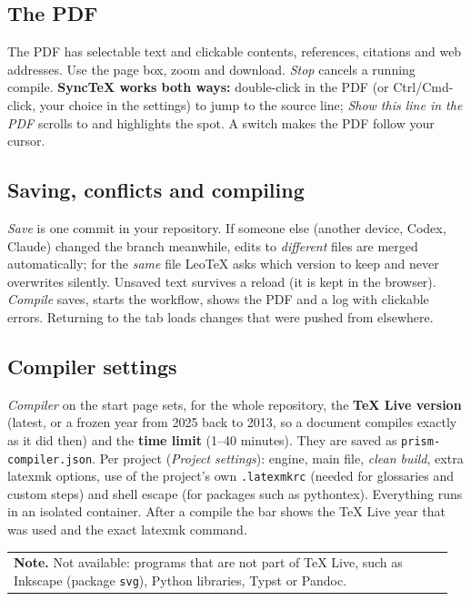 \documentclass[11pt,a4paper]{article}
\newcommand{\leotex}{Leo\TeX{}}
\newcommand{\fpath}[1]{\texttt{\small #1}}
\newenvironment{note}{\par\medskip\noindent\begin{tabular}{|p{0.955\linewidth}}\color{accent}\textbf{Note.} }{\end{tabular}\par\medskip}
\begin{document}
\subsection{The PDF}
The PDF has selectable text and clickable contents, references, citations and web addresses. Use the page box, zoom and download. \emph{Stop}
cancels a running compile. \textbf{SyncTeX works both ways:} double-click in the PDF (or Ctrl/Cmd-click, your choice in the settings) to jump to the
source line; \emph{Show this line in the PDF} scrolls to and highlights the spot. A switch makes the PDF follow your cursor.

\subsection{Saving, conflicts and compiling}
\emph{Save} is one commit in your repository. If someone else (another device, Codex, Claude) changed the branch meanwhile, edits to
\emph{different} files are merged automatically; for the \emph{same} file \leotex{} asks which version to keep and never overwrites
silently. Unsaved text survives a reload (it is kept in the browser). \emph{Compile} saves, starts the workflow, shows the PDF and a log with clickable
errors. Returning to the tab loads changes that were pushed from elsewhere.

\subsection{Compiler settings}
\emph{Compiler} on the start page sets, for the whole repository, the \textbf{\TeX{} Live version} (latest, or a frozen year from 2025 back to 2013, so a
document compiles exactly as it did then) and the \textbf{time limit} (1--40 minutes). They are saved as \fpath{prism-compiler.json}. Per project
(\emph{Project settings}): engine, main file, \emph{clean build}, extra latexmk options, use of the project's own \fpath{.latexmkrc} (needed for glossaries and custom
steps) and shell escape (for packages such as pythontex). Everything runs in an isolated container. After a compile the bar shows the \TeX{} Live year that
was used and the exact latexmk command.

\begin{note}Not available: programs that are not part of \TeX{} Live, such as Inkscape (package \texttt{svg}), Python libraries, Typst or Pandoc.\end{note}
\end{document}

